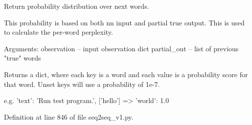 \begin{DoxyVerb}Return probability distribution over next words.

This probability is based on both nn input and partial true output.
This is used to calculate the per-word perplexity.

Arguments:
observation -- input observation dict
partial_out -- list of previous "true" words

Returns a dict, where each key is a word and each value is a
probability score for that word.
Unset keys will use a probability of 1e-7.

e.g.
{'text': 'Run test program.'}, ['hello'] => {'world': 1.0}
\end{DoxyVerb}
 

Definition at line 846 of file seq2seq\+\_\+v1.\+py.



